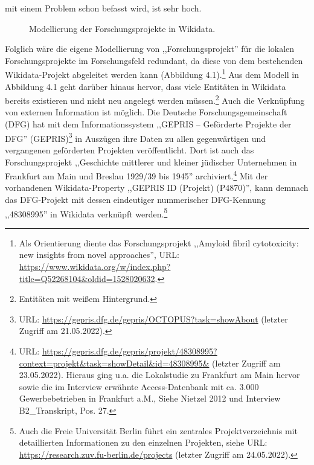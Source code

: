 mit einem Problem schon befasst wird, ist sehr hoch.

\begin{figure}[h]
    \centering
    \caption{Modellierung der Forschungsprojekte in Wikidata.}
    \label{fig:x cubed graph} 
\end{figure}

Folglich wäre die eigene Modellierung von ,,Forschungsprojekt'' für die lokalen Forschungsprojekte im Forschungsfeld redundant, da diese von dem bestehenden Wikidata-Projekt abgeleitet werden kann (Abbildung 4.1).\footnote{Als Orientierung diente das Forschungsprojekt ,,Amyloid fibril cytotoxicity: new insights from novel approaches'', URL: \url{https://www.wikidata.org/w/index.php?title=Q52268104&oldid=1528020632}.} Aus dem Modell in Abbildung 4.1 geht darüber hinaus hervor, dass viele Entitäten in Wikidata bereits existieren und nicht neu angelegt werden müssen.\footnote{Entitäten mit weißem Hintergrund.} Auch die Verknüpfung von externen Information ist möglich. Die Deutsche Forschungsgemeinschaft (DFG) hat mit dem Informationssystem ,,GEPRIS – Geförderte Projekte der DFG'' (GEPRIS)\footnote{URL: \url{https://gepris.dfg.de/gepris/OCTOPUS?task=showAbout} (letzter Zugriff am 21.05.2022).} in Auszügen ihre Daten zu allen gegenwärtigen und vergangenen geförderten Projekten veröffentlicht. Dort ist auch das Forschungsprojekt ,,Geschichte mittlerer und kleiner jüdischer Unternehmen in Frankfurt am Main und Breslau 1929/39 bis 1945'' archiviert.\footnote{URL: \url{https://gepris.dfg.de/gepris/projekt/48308995?context=projekt&task=showDetail&id=48308995&} (letzter Zugriff am 23.05.2022). Hieraus ging u.a. die Lokalstudie zu Frankfurt am Main hervor sowie die im Interview erwähnte Access-Datenbank mit ca. 3.000 Gewerbebetrieben in Frankfurt a.M., Siehe Nietzel 2012 und Interview B2\_Transkript, Pos. 27.} Mit der vorhandenen Wikidata-Property ,,GEPRIS ID (Projekt) (P4870)'', kann demnach das DFG-Projekt mit dessen eindeutiger nummerischer DFG-Kennung ,,48308995'' in Wikidata verknüpft werden.\footnote{Auch die Freie Universität Berlin führt ein zentrales Projektverzeichnis mit detaillierten Informationen zu den einzelnen Projekten, siehe URL: \url{https://research.zuv.fu-berlin.de/projects} (letzter Zugriff am 24.05.2022).}  

